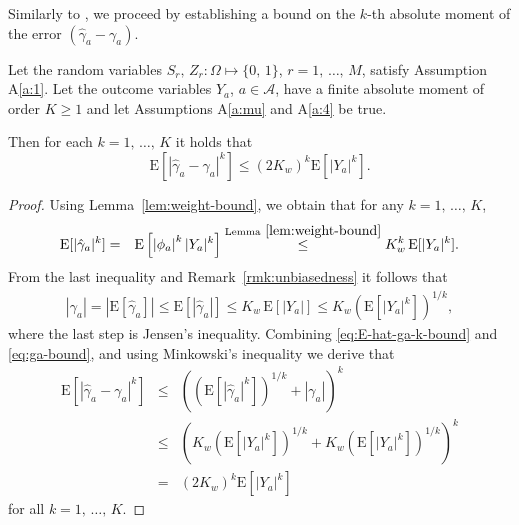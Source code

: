 \documentclass[sigconf]{acmart}
\newcommand{\E}{\mathrm E}
\begin{document}
Similarly to \cite[Lemma~A.3]{harshaw2023erl}, we proceed by establishing a bound on the $k$-th absolute moment of the error $(\hat\gamma_a - \gamma_a)$.
\begin{lemma}\label{lem:kth-abs-moment-bound}
    Let the random variables $S_r,\,Z_r\colon\Omega\mapsto\{0,\,1\}$, $r=1,\,\ldots,\,M$, satisfy Assumption A\ref{a:1}. Let the outcome variables $Y_a$, $a\in\mathcal{A}$, have a finite absolute moment of order $K\ge 1$ and let Assumptions A\ref{a:mu} and A\ref{a:4} be true.

    Then for each $k=1,\,\ldots,\,K$ it holds that
    \begin{equation*}
        \E[|\hat\gamma_a-\gamma_a|^k] \le \left(2K_w\right)^k \E[|Y_a|^k].
    \end{equation*}
\end{lemma}
\begin{proof}
    Using Lemma~\ref{lem:weight-bound}, we obtain that for any $k=1,\,\ldots,\,K$,
    \begin{eqnarray}\label{eq:E-hat-ga-k-bound}
        \E[|\hat\gamma_a|^k] &=& \E\left[\left|\phi_a\right|^k|Y_a|^k\right]
        \stackrel{\textup{Lemma}~\ref{lem:weight-bound}}{\le} K_w^k\,\E[|Y_a|^k].
    \end{eqnarray}
    From the last inequality and Remark~\ref{rmk:unbiasedness} it follows that
    \begin{eqnarray}\label{eq:ga-bound}
        |\gamma_a| = |\E[\hat\gamma_a]| \le \E[|\hat\gamma_a|] \le K_w\,\E[|Y_a|] \le K_w\left(\E[|Y_a|^k]\right)^{1/k},
    \end{eqnarray}
    where the last step is Jensen's inequality. Combining \eqref{eq:E-hat-ga-k-bound} and \eqref{eq:ga-bound}, and using Minkowski's inequality we derive that
    \begin{eqnarray*}
        \E[|\hat\gamma_a-\gamma_a|^k] &\le& \left(\left(\E[|\hat\gamma_a|^k]\right)^{1/k} + |\gamma_a|\right)^{k}\\
        &\le& \left(K_w\left(\E[|Y_a|^k]\right)^{1/k}+K_w\left(\E[|Y_a|^k]\right)^{1/k}\right)^k\\
        &=& \left(2K_w\right)^k\E[|Y_a|^k]
    \end{eqnarray*}
    for all $k=1,\,\ldots,\,K$.
\end{proof}
\end{document}
